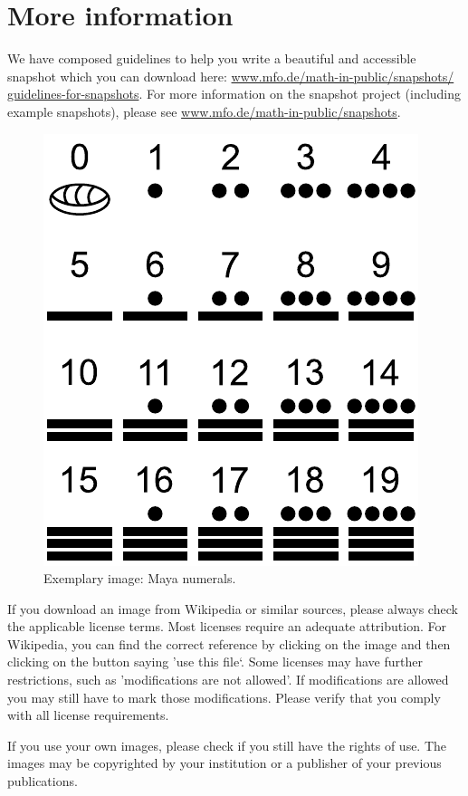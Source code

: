 \documentclass{snapshotmfo}
\begin{document}
\section{More information}
We have composed guidelines to help you write a beautiful and accessible snapshot which you can download here: \href{http://www.mfo.de/math-in-public/snapshots/guidelines-for-snapshots}{www.mfo.de/math-in-public/snapshots/ guidelines-for-snapshots}. For more information on the snapshot project (including example snapshots), please see \href{http://www.mfo.de/math-in-public/snapshots}{www.mfo.de/math-in-public/snapshots}.

\begin{figure}[h]
        \centering 
        \includegraphics[width= 0.33 \textwidth]{maya.pdf}
        \caption{Exemplary image: Maya numerals.}
\label{fig:maya}
\end{figure}

If you download an image from Wikipedia or similar sources, please always check the applicable license terms. Most licenses require an adequate attribution. For Wikipedia, you can find the correct reference by clicking on the image and then clicking on the button saying 'use this file‘. Some licenses may have further restrictions, such as 'modifications are not allowed'. If modifications are allowed you may still have to mark those modifications. Please verify that you comply with all license requirements.

If you use your own images, please check if you still have the rights of use. The images may be copyrighted by your institution or a publisher of your previous publications.
\clearpage
\end{document}
